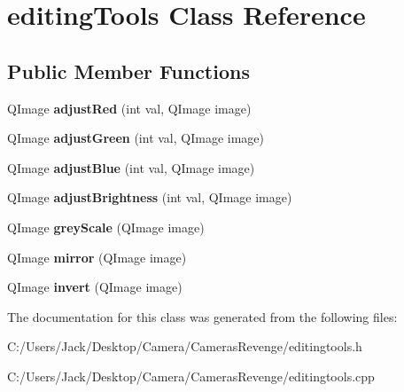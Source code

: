 \hypertarget{classediting_tools}{\section{editing\+Tools Class Reference}
\label{classediting_tools}
}
\subsection*{Public Member Functions}
\begin{DoxyCompactItemize}
\item 
\hypertarget{classediting_tools_a3d0462c6e0bec262bebfe0a2a08fbeba}{Q\+Image {\bfseries adjust\+Red} (int val, Q\+Image image)}\label{classediting_tools_a3d0462c6e0bec262bebfe0a2a08fbeba}

\item 
\hypertarget{classediting_tools_a467d6132872815fc17f1287cf7b06a00}{Q\+Image {\bfseries adjust\+Green} (int val, Q\+Image image)}\label{classediting_tools_a467d6132872815fc17f1287cf7b06a00}

\item 
\hypertarget{classediting_tools_ad465cdd922230feb96587c2651cc81d9}{Q\+Image {\bfseries adjust\+Blue} (int val, Q\+Image image)}\label{classediting_tools_ad465cdd922230feb96587c2651cc81d9}

\item 
\hypertarget{classediting_tools_ad69fd0d815a99459a2a344df804402a2}{Q\+Image {\bfseries adjust\+Brightness} (int val, Q\+Image image)}\label{classediting_tools_ad69fd0d815a99459a2a344df804402a2}

\item 
\hypertarget{classediting_tools_a65f3cb5ce16ab4ece00665398739a763}{Q\+Image {\bfseries grey\+Scale} (Q\+Image image)}\label{classediting_tools_a65f3cb5ce16ab4ece00665398739a763}

\item 
\hypertarget{classediting_tools_a6c11ba137088276e8640fdde4024236c}{Q\+Image {\bfseries mirror} (Q\+Image image)}\label{classediting_tools_a6c11ba137088276e8640fdde4024236c}

\item 
\hypertarget{classediting_tools_a1ee269ddd19fa2e71a8a09ef0e066ab3}{Q\+Image {\bfseries invert} (Q\+Image image)}\label{classediting_tools_a1ee269ddd19fa2e71a8a09ef0e066ab3}

\end{DoxyCompactItemize}


The documentation for this class was generated from the following files\+:\begin{DoxyCompactItemize}
\item 
C\+:/\+Users/\+Jack/\+Desktop/\+Camera/\+Cameras\+Revenge/editingtools.\+h\item 
C\+:/\+Users/\+Jack/\+Desktop/\+Camera/\+Cameras\+Revenge/editingtools.\+cpp\end{DoxyCompactItemize}
